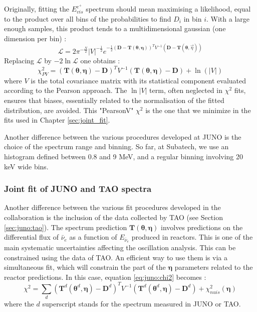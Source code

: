 \documentclass[../main.tex]{subfiles}
\begin{document}
Originally, fitting the $E^{e^+}_{vis}$ spectrum should mean maximising a likelihood, equal to the product over all bins of the probabilities to find $D_i$ in bin $i$. With a large enough samples, this product tends to a multidimensional gaussian (one dimension per bin) :
\begin{equation}
  \mathcal{L} = 2\pi^{-\frac{N}{2}} |V|^{-\frac{1}{2}}  e^{-\frac{1}{2}\left(\bm{D}-\bm{T}(\bm{\theta},\bm{\eta})\right)^T V^{-1} \left( \bm{D}-\bm{T}(\bm{\theta},\vec{\eta}) \right)}
\end{equation}
Replacing $\mathcal{L}$ by $-2 \ln \mathcal{L}$ one obtains :
\begin{equation}
\chi^2_{PV} = \left(\bm{T}(\bm{\theta},\bm{\eta}) - \bm{D} \right)^T V^{-1} \left(\bm{T}(\bm{\theta},\bm{\eta}) - \bm{D}  \right) + \ln(|V|)
\end{equation}
where $V$ is the total covariance matrix with its statistical component evaluated according to the Pearson approach. The $\ln|V|$ term, often neglected in $\chi^2$ fits, ensures that biases, essentially related to the normalisation of the fitted distribution, are avoided. This "PearsonV" $\chi^2$ is the one that we minimize in the fits used in Chapter \ref{sec:joint_fit}.

Another difference between the various procedures developed at JUNO is the choice of the spectrum range and binning. So far, at Subatech, we use an histogram defined between 0.8 and 9 MeV, and a regular binning involving 20 keV wide bins.

\subsubsection{Joint fit of JUNO and TAO spectra}

Another difference between the various fit procedures developed in the collaboration is the inclusion of the data collected by TAO (see Section \ref{sec:juno:tao}). The spectrum prediction $\bm{T}(\bm{\theta},\bm{\eta})$ involves predictions on the differential flux of $\bar{\nu}_e$ as a function of $E_{\bar{\nu}_e}$ produced in reactors. This is one of the main systematic uncertainties affecting the oscillation analysis. This can be constrained using the data of TAO. An efficient way to use them is via a simultaneous fit, which will constrain the part of the $\bm{\eta}$ parameters related to the reactor predictions. In this case, equation \ref{eq:juno:chi2} becomes :
\begin{equation}
  \chi^2 = \sum_{d}\left(\bm{T}^d(\bm{\theta}^d,\bm{\eta}) - \bm{D}^d  \right)^T V^{-1} \left(\bm{T}^d(\bm{\theta}^d,\bm{\eta}) - \bm{D}^d  \right) +  \chi^2_{nuis}(\bm{\eta})
\end{equation}
where the $d$ superscript stands for the spectrum measured in JUNO or TAO.
\end{document}
